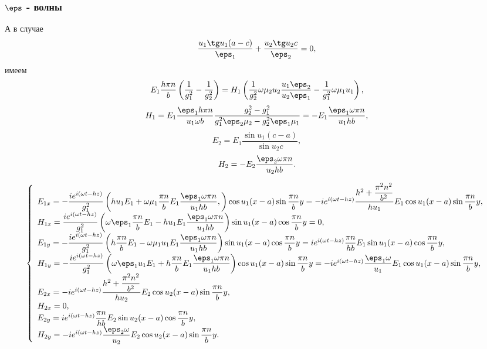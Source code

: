 \documentclass[12pt]{hedsemwork}
\renewcommand{\frac}{\dfrac}
\begin{document}
\subsubsection{\(\boldsymbol{\eps}\) - волны}
А в случае
\[
    \frac{u_1\tg u_1 (a-c)}{\eps_1} + \frac{u_2\tg u_2 c}{\eps_2} = 0,
\]
имеем
\[
    E_1\frac{h\pi n}{b}\left(\frac{1}{g_1^2}-\frac{1}{g_2^2}\right)=
    H_1\left(\frac{1}{g_2^2}\omega\mu_2u_2\frac{u_1\eps_2}{u_2\eps_1}-
    \frac{1}{g_1^2}\omega\mu_1u_1\right),
\]
\[
    H_1 = E_1\frac{\eps_1h\pi n}{u_1\omega b}
    \frac{g_2^2-g_1^2}{g_1^2\eps_2\mu_2 - g_2^2\eps_1\mu_1} =
    -E_1\frac{\eps_1\omega\pi n}{u_1hb},
\]
\[
    E_2 = E_1\frac{\sin u_1(c-a)}{\sin u_2 c},
\]
\[
    H_2 = -E_2\frac{\eps_2\omega\pi n}{u_2hb}.
\]

\[
    \left\{
    \begin{array}{l}
        E_{1x} = -\frac{i e^{i(\omega t - h z)}}{g_1^2}
        \left(h u_1 E_1 +
        \omega\mu_1\frac{\pi n}{b}E_1\frac{\eps_1\omega\pi n}{u_1hb},\right)
        \cos u_1 (x-a) \sin \frac{\pi n}{b}y =-i e^{i(\omega t - h z)}
        \frac{h^2 + \frac{\pi^2 n^2}{b^2}}
        {hu_1}E_1\cos u_1 (x-a) \sin \frac{\pi n}{b}y,\\
        H_{1x} = \frac{i e^{i(\omega t - h z)}}{g_1^2}
        \left(\omega\eps_1\frac{\pi n}{b}E_1-
        h u_1 E_1\frac{\eps_1\omega\pi n}{u_1hb}\right)
        \sin u_1 (x-a) \cos \frac{\pi n}{b}y = 0,\\
        E_{1y} = -\frac{i e^{i(\omega t - h z)}}{g_1^2}
        \left(h \frac{\pi n}{b} E_1 -
        \omega\mu_1u_1E_1\frac{\eps_1\omega\pi n}{u_1hb}\right)
        \sin u_1 (x-a) \cos \frac{\pi n}{b}y = i e^{i(\omega t - h z)}
        \frac{\pi n}{hb} E_1\sin u_1 (x-a) \cos \frac{\pi n}{b}y,\\
        H_{1y} = -\frac{i e^{i(\omega t - h z)}}{g_1^2}
        \left(\omega\eps_1u_1E_1+
        h \frac{\pi n}{b} E_1\frac{\eps_1\omega\pi n}{u_1hb}\right)
        \cos u_1 (x-a) \sin \frac{\pi n}{b}y = -i e^{i(\omega t - h z)}
        \frac{\eps_1\omega}{u_1}E_1\cos u_1 (x-a) \sin \frac{\pi n}{b}y,\\
        E_{2x} = -i e^{i(\omega t - h z)}\frac{h^2 + \frac{\pi^2 n^2}{b^2}}
        {hu_2}E_2\cos u_2 (x-a) \sin \frac{\pi n}{b}y,\\
        H_{2x} = 0,\\
        E_{2y} = i e^{i(\omega t - h z)}\frac{\pi n}{hb}
        E_2\sin u_2 (x-a) \cos \frac{\pi n}{b}y,\\
        H_{2y} = -i e^{i(\omega t - h z)} \frac{\eps_2\omega}{u_2}
        E_2\cos u_2 (x-a) \sin \frac{\pi n}{b}y.\\
    \end{array}
    \right.
\]
\end{document}
